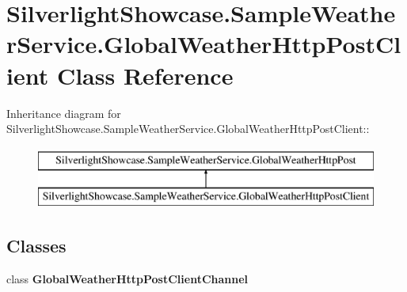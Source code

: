 \hypertarget{class_silverlight_showcase_1_1_sample_weather_service_1_1_global_weather_http_post_client}{
\section{SilverlightShowcase.SampleWeatherService.GlobalWeatherHttpPostClient Class Reference}
\label{class_silverlight_showcase_1_1_sample_weather_service_1_1_global_weather_http_post_client}
}
Inheritance diagram for SilverlightShowcase.SampleWeatherService.GlobalWeatherHttpPostClient::\begin{figure}[H]
\begin{center}
\leavevmode
\includegraphics[height=2cm]{class_silverlight_showcase_1_1_sample_weather_service_1_1_global_weather_http_post_client}
\end{center}
\end{figure}
\subsection*{Classes}
\begin{DoxyCompactItemize}
\item 
class {\bfseries GlobalWeatherHttpPostClientChannel}
\end{DoxyCompactItemize}
